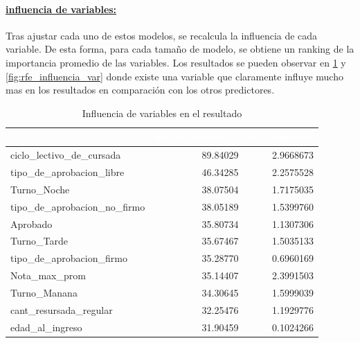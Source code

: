 \paragraph{\underline{influencia de variables:}}
Tras ajustar cada uno de estos modelos, se recalcula la influencia de cada variable. De esta forma, para cada tamaño de modelo, se obtiene un ranking de la importancia promedio de las variables. Los resultados se pueden observar en \ref{tab:tf_rfe_influencia_variables} y \ref{fig:rfe_influencia_var} donde existe una variable que claramente influye mucho mas en los resultados en comparación con los otros predictores.

\begin{table}[!h]
	
	\caption{\label{tab:tf_rfe_influencia_variables}Influencia de variables en el resultado}
	\centering
	\begin{tabular}[t]{lrr}
		\toprule
		\rowcolor{black}  \multicolumn{1}{c}{\textcolor{white}{\textbf{var}}} & \multicolumn{1}{c}{\textcolor{white}{\textbf{media\_influencia}}} & \multicolumn{1}{c}{\textcolor{white}{\textbf{sd\_influencia}}}\\
		\midrule
		\rowcolor{gray!6}  ciclo\_lectivo\_de\_cursada & 89.84029 & 2.9668673\\
		tipo\_de\_aprobacion\_libre & 46.34285 & 2.2575528\\
		\rowcolor{gray!6}  Turno\_Noche & 38.07504 & 1.7175035\\
		tipo\_de\_aprobacion\_no\_firmo & 38.05189 & 1.5399760\\
		\rowcolor{gray!6}  Aprobado & 35.80734 & 1.1307306\\
		\addlinespace
		Turno\_Tarde & 35.67467 & 1.5035133\\
		\rowcolor{gray!6}  tipo\_de\_aprobacion\_firmo & 35.28770 & 0.6960169\\
		Nota\_max\_prom & 35.14407 & 2.3991503\\
		\rowcolor{gray!6}  Turno\_Manana & 34.30645 & 1.5999039\\
		cant\_resursada\_regular & 32.25476 & 1.1929776\\
		\addlinespace
		\rowcolor{gray!6}  edad\_al\_ingreso & 31.90459 & 0.1024266\\
		\bottomrule
	\end{tabular}
\end{table}

